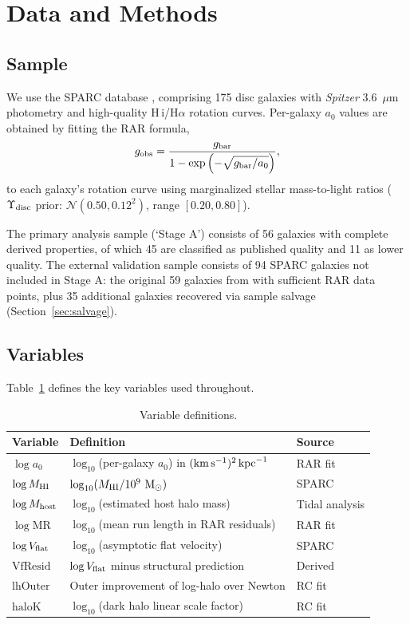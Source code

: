 \documentclass[fleqn,usenatbib]{mnras}
\newcommand{\azero}{a_0}
\newcommand{\vflat}{V_{\rm flat}}
\newcommand{\vfresid}{\mathrm{VfResid}}
\newcommand{\lhOuter}{\mathrm{lhOuter}}
\newcommand{\haloK}{\mathrm{haloK}}
\newcommand{\mhi}{M_{\rm HI}}
\newcommand{\mhost}{M_{\rm host}}
\newcommand{\kms}{{\rm km\,s^{-1}}}
\newcommand{\msun}{{\rm M}_\odot}
\begin{document}
\section{Data and Methods}
\label{sec:data}

\subsection{Sample}
\label{sec:sample}

We use the SPARC database \citep{Lelli2016a}, comprising 175 disc galaxies
with \textit{Spitzer} 3.6~$\mu$m photometry and high-quality H\,{\sc i}/H$\alpha$
rotation curves. Per-galaxy $\azero$ values are obtained by fitting the
\citet{McGaugh2016} RAR formula,
\begin{equation}
g_{\rm obs} = \frac{g_{\rm bar}}{1 - \exp\left(-\sqrt{g_{\rm bar}/\azero}\right)},
\label{eq:rar}
\end{equation}
to each galaxy's rotation curve using marginalized stellar mass-to-light
ratios ($\Upsilon_{\rm disc}$ prior: $\mathcal{N}(0.50, 0.12^2)$,
range $[0.20, 0.80]$).

The primary analysis sample (`Stage A') consists of 56 galaxies with
complete derived properties, of which 45 are classified as published quality
and 11 as lower quality. The external validation sample consists of 94
SPARC galaxies not included in Stage A: the original 59 galaxies from
 with sufficient RAR data points, plus 35 additional
galaxies recovered via sample salvage (Section~\ref{sec:salvage}).

\subsection{Variables}
\label{sec:variables}

Table~\ref{tab:variables} defines the key variables used throughout.

\begin{table}
\centering
\caption{Variable definitions.}
\label{tab:variables}
\begin{tabular}{@{}lll@{}}
\hline
Variable & Definition & Source \\
\hline
$\log \azero$ & $\log_{10}$(per-galaxy $\azero$) in $(\kms)^2\,{\rm kpc}^{-1}$ & RAR fit \\
$\log \mhi$ & $\log_{10}(\mhi / 10^9~\msun)$ & SPARC \\
$\log \mhost$ & $\log_{10}$(estimated host halo mass) & Tidal analysis \\
$\log$MR & $\log_{10}$(mean run length in RAR residuals) & RAR fit \\
$\log \vflat$ & $\log_{10}$(asymptotic flat velocity) & SPARC \\
$\vfresid$ & $\log \vflat$ minus structural prediction & Derived \\
$\lhOuter$ & Outer improvement of log-halo over Newton & RC fit \\
$\haloK$ & $\log_{10}$(dark halo linear scale factor) & RC fit \\
\hline
\end{tabular}
\end{table}
\end{document}
